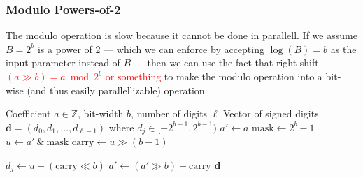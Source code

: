
\subsubsection{Modulo Powers-of-2}
The modulo operation is slow because it cannot be done in parallell. If we assume $B = 2^b$ is a power of 2 --- which we can enforce by accepting $\log(B) = b$ as the input parameter instead of $B$ --- then we can use the fact that right-shift \textcolor{red}{$(a \gg b) = a \bmod{2^b}$ or something} to make the modulo operation into a bit-wise (and thus easily parallellizable) operation.

\begin{algorithm}
\caption{Optimized Branchless Signed LSB Decomposition ($B = 2^b$)}
\begin{algorithmic}[1]
\Require Coefficient $a \in \mathbb{Z}$, bit-width $b$, number of digits $\ell$
\Ensure Vector of signed digits $\mathbf{d} = (d_0, d_1, \dots, d_{\ell-1})$ where $d_j \in [-2^{b-1}, 2^{b-1})$
\State $a' \gets a$
\State $\text{mask} \gets 2^b - 1$
    \State $u \gets a' \ \& \ \text{mask}$ 
    \State $\text{carry} \gets u \gg (b - 1)$ 
    
    \State $d_j \gets u - (\text{carry} \ll b)$ 
    \State $a' \gets (a' \gg b) + \text{carry}$ 
\EndFor
\State \Return $\mathbf{d}$
\end{algorithmic}
\end{algorithm}

